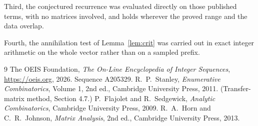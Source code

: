 \documentclass[11pt,a4paper]{article}
\theoremstyle{plain}
\theoremstyle{definition}
\begin{document}
Third, the conjectured recurrence was evaluated directly on those published terms, with no
matrices involved, and holds wherever the proved range and the data overlap.

Fourth, the annihilation test of Lemma~\ref{lem:crit} was carried out in exact integer
arithmetic on the whole vector rather than on a sampled prefix.

\begin{thebibliography}{9}
 The OEIS Foundation, \emph{The On-Line Encyclopedia of Integer
Sequences}, \url{https://oeis.org}, 2026. Sequence A205329.
 R.~P.~Stanley, \emph{Enumerative Combinatorics}, Volume 1, 2nd ed.,
Cambridge University Press, 2011. (Transfer-matrix method, Section 4.7.)
 P.~Flajolet and R.~Sedgewick, \emph{Analytic Combinatorics}, Cambridge
University Press, 2009.
 R.~A.~Horn and C.~R.~Johnson, \emph{Matrix Analysis}, 2nd ed., Cambridge
University Press, 2013.
\end{thebibliography}
\end{document}
